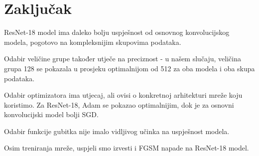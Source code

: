 \chapter{Zaključak}

ResNet-18 model ima daleko bolju uspješnost od osnovnog konvolucijskog modela, pogotovo na kompleksnijim skupovima podataka.

Odabir veličine grupe također utječe na preciznost - u našem slučaju, veličina grupa 128 se pokazala u prosjeku optimalnijom od 512 za oba modela i oba skupa podataka.

Odabir optimizatora ima utjecaj, ali ovisi o konkretnoj arhitekturi mreže koju koristimo. Za ResNet-18, Adam se pokazao optimalnijim, dok je za osnovni konvolucijski model bolji SGD.

Odabir funkcije gubitka nije imalo vidljivog učinka na uspješnost modela.

Osim treniranja mreže, uspjeli smo izvesti i FGSM napade na ResNet-18 model.